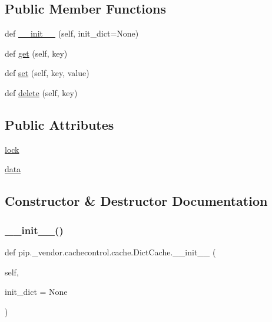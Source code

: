 \subsection*{Public Member Functions}
\begin{DoxyCompactItemize}
\item 
def \hyperlink{classpip_1_1__vendor_1_1cachecontrol_1_1cache_1_1DictCache_afcce95ece087b26f7bd95028b248c320}{\+\_\+\+\_\+init\+\_\+\+\_\+} (self, init\+\_\+dict=None)
\item 
def \hyperlink{classpip_1_1__vendor_1_1cachecontrol_1_1cache_1_1DictCache_af092ece36a8cce3cdb2b6e899405819a}{get} (self, key)
\item 
def \hyperlink{classpip_1_1__vendor_1_1cachecontrol_1_1cache_1_1DictCache_a9b5614f237eb177116da66a9c12bf63d}{set} (self, key, value)
\item 
def \hyperlink{classpip_1_1__vendor_1_1cachecontrol_1_1cache_1_1DictCache_abd0976cb09cf07de12b3323fe67ec164}{delete} (self, key)
\end{DoxyCompactItemize}
\subsection*{Public Attributes}
\begin{DoxyCompactItemize}
\item 
\hyperlink{classpip_1_1__vendor_1_1cachecontrol_1_1cache_1_1DictCache_abd9183c4609c3144dca511d5b71ce23a}{lock}
\item 
\hyperlink{classpip_1_1__vendor_1_1cachecontrol_1_1cache_1_1DictCache_a30f851f694f32ecbff477a702904b347}{data}
\end{DoxyCompactItemize}


\subsection{Constructor \& Destructor Documentation}
\mbox{\label{classpip_1_1__vendor_1_1cachecontrol_1_1cache_1_1DictCache_afcce95ece087b26f7bd95028b248c320}} 
\subsubsection{\texorpdfstring{\+\_\+\+\_\+init\+\_\+\+\_\+()}{\_\_init\_\_()}}
{\footnotesize\ttfamily def pip.\+\_\+vendor.\+cachecontrol.\+cache.\+Dict\+Cache.\+\_\+\+\_\+init\+\_\+\+\_\+ (\begin{DoxyParamCaption}\item[{}]{self,  }\item[{}]{init\+\_\+dict = {\ttfamily None} }\end{DoxyParamCaption})}



